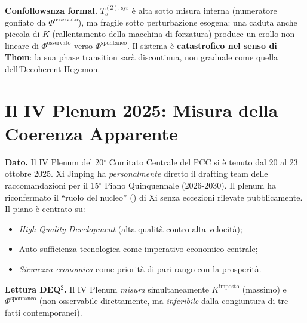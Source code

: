 \Proved{} \textbf{Confollowsnza formal.} \(T_s^{(2),\text{sys}}\) è alta
sotto misura interna (numeratore gonfiato da
\(\Phi^{\text{osservato}}\)), ma fragile sotto perturbazione esogena:
una caduta anche piccola di \(K\) (rallentamento della macchina di
forzatura) produce un crollo non lineare di \(\Phi^{\text{osservato}}\)
verso \(\Phi^{\text{spontaneo}}\). Il sistema è \textbf{catastrofico nel
senso di Thom}: la sua phase transition sarà discontinua, non
graduale come quella dell'Decoherent Hegemon.



\section{Il IV Plenum 2025: Misura della Coerenza
Apparente}\label{il-iv-plenum-2025-misura-della-coerenza-apparente}

\Proved{} \textbf{Dato.} Il IV Plenum del 20$^\circ$ Comitato Centrale del PCC
si è tenuto dal 20 al 23 ottobre 2025. Xi Jinping ha
\emph{personalmente} diretto il drafting team delle raccomandazioni per
il 15$^\circ$ Piano Quinquennale (2026-2030). Il plenum ha riconfermato il
``ruolo del nucleo'' () di Xi senza eccezioni rilevate pubblicamente. Il
piano è centrato su:

\begin{itemize}
\tightlist
\item
  \emph{High-Quality Development} (alta qualità contro alta velocità);
\item
  Auto-sufficienza tecnologica come imperativo economico centrale;
\item
  \emph{Sicurezza economica} come priorità di pari rango con la
  prosperità.
\end{itemize}

\Hypoth{} \textbf{Lettura DEQ$^2$.} Il IV Plenum \emph{misura}
simultaneamente \(K^{\text{imposto}}\) (massimo) e
\(\Phi^{\text{spontaneo}}\) (non osservabile direttamente, ma
\emph{inferibile} dalla congiuntura di tre fatti contemporanei).

